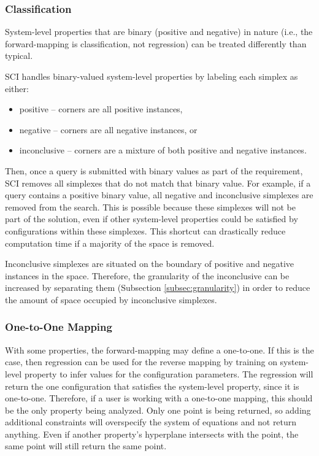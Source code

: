   \subsubsection{Classification}
System-level properties that are binary (positive and negative) in nature (i.e., the forward-mapping is classification, not regression) can be treated differently than typical.

SCI handles binary-valued system-level properties by labeling each simplex as either:
\begin{itemize}
\item positive -- corners are all positive instances,
\item negative -- corners are all negative instances, or
\item inconclusive -- corners are a mixture of both positive and negative instances.
\end{itemize}
Then, once a query is submitted with binary values as part of the requirement, SCI removes all simplexes that do not match that binary value.
For example, if a query contains a positive binary value, all negative and inconclusive simplexes are removed from the search.
This is possible because these simplexes will not be part of the solution, even if other system-level properties could be satisfied by configurations within these simplexes.
This shortcut can drastically reduce computation time if a majority of the space is removed.

Inconclusive simplexes are situated on the boundary of positive and negative instances in the space.
Therefore, the granularity of the inconclusive can be increased by separating them (Subsection \ref{subsec:granularity}) in order to reduce the amount of space occupied by inconclusive simplexes.


   \subsubsection{One-to-One Mapping}
With some properties, the forward-mapping may define a one-to-one.
If this is the case, then regression can be used for the reverse mapping by training on system-level property to infer values for the configuration parameters.
The regression will return the one configuration that satisfies the system-level property, since it is one-to-one.
Therefore, if a user is working with a one-to-one mapping, this should be the only property being analyzed.
Only one point is being returned, so adding additional constraints will overspecify the system of equations and not return anything.
Even if another property's hyperplane intersects with the point, the same point will still return the same point.

